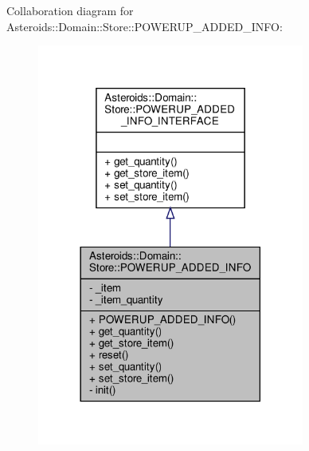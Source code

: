 Collaboration diagram for Asteroids\+:\+:Domain\+:\+:Store\+:\+:P\+O\+W\+E\+R\+U\+P\+\_\+\+A\+D\+D\+E\+D\+\_\+\+I\+N\+FO\+:\nopagebreak
\begin{figure}[H]
\begin{center}
\leavevmode
\includegraphics[width=249pt]{classAsteroids_1_1Domain_1_1Store_1_1POWERUP__ADDED__INFO__coll__graph}
\end{center}
\end{figure}
